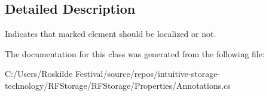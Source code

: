 \subsection{Detailed Description}
Indicates that marked element should be localized or not. 


\begin{DoxyCode}{0}
\DoxyCodeLine{\}}
\end{DoxyCode}


The documentation for this class was generated from the following file\+:\begin{DoxyCompactItemize}
\item 
C\+:/\+Users/\+Roskilde Festival/source/repos/intuitive-\/storage-\/technology/\+R\+F\+Storage/\+R\+F\+Storage/\+Properties/Annotations.\+cs\end{DoxyCompactItemize}

